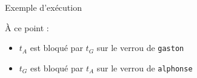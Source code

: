 \begin{frame}[fragile]{Exemple d'exécution}
{
  }

  \begin{alertblock}{À ce point :}
    \begin{itemize}
    \item $t_A$ est bloqué par $t_G$ sur le verrou de \lstinline{gaston}
    \item $t_G$ est bloqué par $t_A$ sur le verrou de \lstinline{alphonse}
    \end{itemize}
  \end{alertblock}
  
\end{frame}

\endgroup
\endinput
